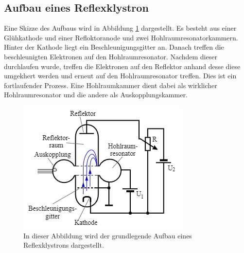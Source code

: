 \subsection{Aufbau eines Reflexklystron}
\label{subsec:aufbau_klystron}
Eine Skizze des Aufbaus wird in Abbildung \ref{fig:reflexklystron} dargestellt. Es besteht aus einer Glühkathode und einer Refloktoranode und zwei Hohlraumresonatorkammern. Hinter 
der Kathode liegt ein Beschleunigungsgitter an. Danach treffen die beschleunigten Elektronen auf den Hohlraumresonator. Nachdem dieser durchlaufen wurde, treffen die Elektronen auf 
den Reflektor anhand desse diese umgekhert werden und erneut auf den Hohlraumresonator treffen. Dies ist ein fortlaufender Prozess. Eine Hohlraumkammer dient dabei als wirklicher 
Hohlraumresonator und die andere als Auskopplungskammer.
\begin{figure}
              \centering
              \includegraphics{content/reflexklystron.PNG}
              \caption{In dieser Abbildung wird der grundlegende Aufbau eines Reflexklystrons dargestellt.}
              \label{fig:reflexklystron}
\end{figure}
